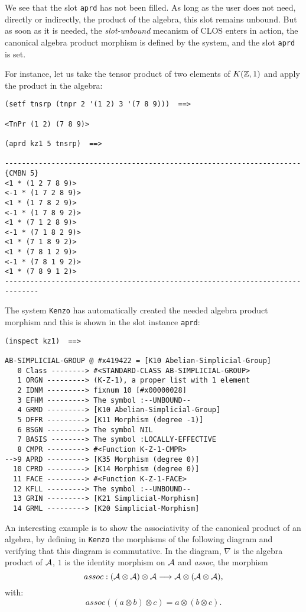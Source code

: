 We see that  the slot {\tt aprd} has not been filled. As long as the user does not  need, directly or indirectly,
the product of the algebra, this slot remains unbound. But as soon as it is needed, the {\em slot-unbound}
mecanism of CLOS enters in action, the canonical algebra product morphism is defined by the system, and the slot
{\tt aprd} is set.\par
For instance, let us take the tensor product of two elements of  $K({{\Bbb Z}}, 1)$ and apply the
product in the algebra:
{\footnotesize\begin{verbatim}
(setf tnsrp (tnpr 2 '(1 2) 3 '(7 8 9)))  ==>

<TnPr (1 2) (7 8 9)>

(aprd kz1 5 tnsrp)  ==>

----------------------------------------------------------------------{CMBN 5}
<1 * (1 2 7 8 9)>
<-1 * (1 7 2 8 9)>
<1 * (1 7 8 2 9)>
<-1 * (1 7 8 9 2)>
<1 * (7 1 2 8 9)>
<-1 * (7 1 8 2 9)>
<1 * (7 1 8 9 2)>
<1 * (7 8 1 2 9)>
<-1 * (7 8 1 9 2)>
<1 * (7 8 9 1 2)>
------------------------------------------------------------------------------
\end{verbatim}}
The system {\tt Kenzo} has automatically created the needed algebra product morphism  and 
this is shown in the slot instance {\tt aprd}:
{\footnotesize\begin{verbatim}
(inspect kz1)  ==>

AB-SIMPLICIAL-GROUP @ #x419422 = [K10 Abelian-Simplicial-Group]
   0 Class --------> #<STANDARD-CLASS AB-SIMPLICIAL-GROUP>
   1 ORGN ---------> (K-Z-1), a proper list with 1 element
   2 IDNM ---------> fixnum 10 [#x00000028]
   3 EFHM ---------> The symbol :--UNBOUND--
   4 GRMD ---------> [K10 Abelian-Simplicial-Group]
   5 DFFR ---------> [K11 Morphism (degree -1)]
   6 BSGN ---------> The symbol NIL
   7 BASIS --------> The symbol :LOCALLY-EFFECTIVE
   8 CMPR ---------> #<Function K-Z-1-CMPR>
-->9 APRD ---------> [K35 Morphism (degree 0)]
  10 CPRD ---------> [K14 Morphism (degree 0)]
  11 FACE ---------> #<Function K-Z-1-FACE>
  12 KFLL ---------> The symbol :--UNBOUND--
  13 GRIN ---------> [K21 Simplicial-Morphism]
  14 GRML ---------> [K20 Simplicial-Morphism]
\end{verbatim}}

An interesting example is to show the associativity of the canonical product of
an algebra, by defining in {\tt Kenzo} the morphisms of the following diagram
and verifying that this diagram is commutative. In the diagram, $\nabla$ is the
algebra product of ${\cal A}$, $1$ is the identity morphism on ${\cal A}$ and
{\em assoc}, the morphism
$$assoc: ({\cal A}\otimes {\cal A}) \otimes {\cal A} \longrightarrow {\cal A} \otimes ({\cal A}\otimes {\cal A}),$$
with:
$$assoc((a\otimes b)\otimes c) = a \otimes (b \otimes c).$$

